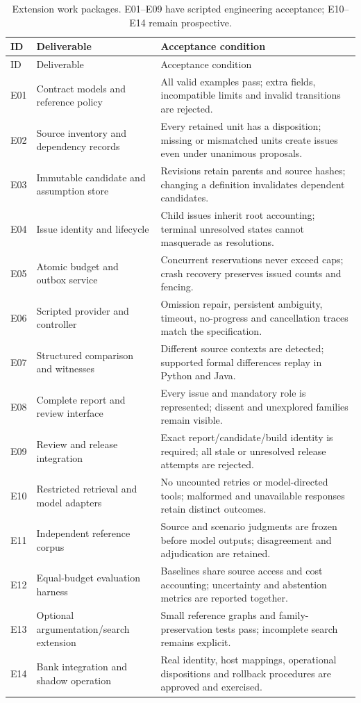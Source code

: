 \begin{longtable}{P{13mm}P{49mm}P{85mm}}
\caption{Extension work packages. E01--E09 have scripted engineering acceptance;
E10--E14 remain prospective.}\label{tab:extension-tasks}\\
\toprule
ID & Deliverable & Acceptance condition\\\midrule\endfirsthead
\toprule ID & Deliverable & Acceptance condition\\\midrule\endhead
E01 & Contract models and reference policy & All valid examples pass; extra fields, incompatible limits and invalid transitions are rejected.\\
E02 & Source inventory and dependency records & Every retained unit has a disposition; missing or mismatched units create issues even under unanimous proposals.\\
E03 & Immutable candidate and assumption store & Revisions retain parents and source hashes; changing a definition invalidates dependent candidates.\\
E04 & Issue identity and lifecycle & Child issues inherit root accounting; terminal unresolved states cannot masquerade as resolutions.\\
E05 & Atomic budget and outbox service & Concurrent reservations never exceed caps; crash recovery preserves issued counts and fencing.\\
E06 & Scripted provider and controller & Omission repair, persistent ambiguity, timeout, no-progress and cancellation traces match the specification.\\
E07 & Structured comparison and witnesses & Different source contexts are detected; supported formal differences replay in Python and Java.\\
E08 & Complete report and review interface & Every issue and mandatory role is represented; dissent and unexplored families remain visible.\\
E09 & Review and release integration & Exact report/candidate/build identity is required; all stale or unresolved release attempts are rejected.\\
E10 & Restricted retrieval and model adapters & No uncounted retries or model-directed tools; malformed and unavailable responses retain distinct outcomes.\\
E11 & Independent reference corpus & Source and scenario judgments are frozen before model outputs; disagreement and adjudication are retained.\\
E12 & Equal-budget evaluation harness & Baselines share source access and cost accounting; uncertainty and abstention metrics are reported together.\\
E13 & Optional argumentation/search extension & Small reference graphs and family-preservation tests pass; incomplete search remains explicit.\\
E14 & Bank integration and shadow operation & Real identity, host mappings, operational dispositions and rollback procedures are approved and exercised.\\
\bottomrule
\end{longtable}


